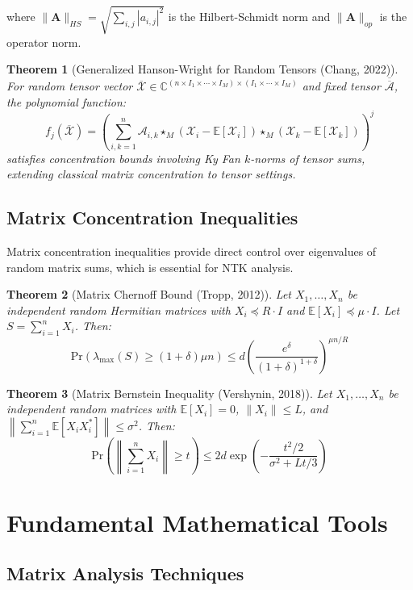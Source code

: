 \documentclass{article}
\newtheorem{theorem}{Theorem}[section]
\newcommand{\E}{\mathbb{E}}
\newcommand{\C}{\mathbb{C}}
\newcommand{\Pr}{\text{Pr}}
\begin{document}
where $\|\mathbf{A}\|_{HS} = \sqrt{\sum_{i,j} |a_{i,j}|^2}$ is the Hilbert-Schmidt norm and $\|\mathbf{A}\|_{op}$ is the operator norm.

\begin{theorem}[Generalized Hanson-Wright for Random Tensors (Chang, 2022)]
For random tensor vector $\overline{\mathcal{X}} \in \C^{(n \times I_1 \times \cdots \times I_M) \times (I_1 \times \cdots \times I_M)}$ and fixed tensor $\overline{\overline{\mathcal{A}}}$, the polynomial function:
$$f_j(\overline{\mathcal{X}}) = \left(\sum_{i,k=1}^n \mathcal{A}_{i,k} \star_M (\mathcal{X}_i - \E[\mathcal{X}_i]) \star_M (\mathcal{X}_k - \E[\mathcal{X}_k])\right)^j$$
satisfies concentration bounds involving Ky Fan $k$-norms of tensor sums, extending classical matrix concentration to tensor settings.
\end{theorem}

\subsection{Matrix Concentration Inequalities}

Matrix concentration inequalities provide direct control over eigenvalues of random matrix sums, which is essential for NTK analysis.

\begin{theorem}[Matrix Chernoff Bound (Tropp, 2012)]
Let $X_1, \ldots, X_n$ be independent random Hermitian matrices with $X_i \preceq R \cdot I$ and $\E[X_i] \preceq \mu \cdot I$. Let $S = \sum_{i=1}^n X_i$. Then:
$$\Pr(\lambda_{\max}(S) \geq (1+\delta)\mu n) \leq d \left(\frac{e^\delta}{(1+\delta)^{1+\delta}}\right)^{\mu n / R}$$
\end{theorem}

\begin{theorem}[Matrix Bernstein Inequality (Vershynin, 2018)]
Let $X_1, \ldots, X_n$ be independent random matrices with $\E[X_i] = 0$, $\|X_i\| \leq L$, and $\left\|\sum_{i=1}^n \E[X_i X_i^*]\right\| \leq \sigma^2$. Then:
$$\Pr\left(\left\|\sum_{i=1}^n X_i\right\| \geq t\right) \leq 2d \exp\left(-\frac{t^2/2}{\sigma^2 + Lt/3}\right)$$
\end{theorem}

\section{Fundamental Mathematical Tools}

\subsection{Matrix Analysis Techniques}
\end{document}
